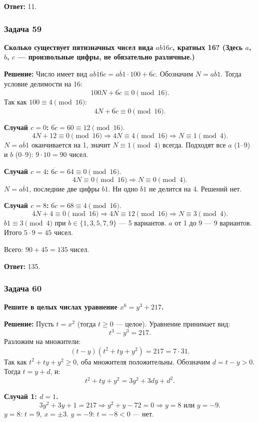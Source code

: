 \documentclass[12pt, a4paper]{article}
\begin{document}
\textbf{Ответ:} 11.

\subsubsection*{Задача 59}
\textbf{Сколько существует пятизначных чисел вида $\overline{ab16c}$, кратных 16? (Здесь $a$, $b$, $c$ — произвольные цифры, не обязательно различные.)}

\textbf{Решение:}
Число имеет вид $\overline{ab16c} = \overline{ab1} \cdot 100 + \overline{6c}$. Обозначим $N = \overline{ab1}$. Тогда условие делимости на 16:
\[
100N + \overline{6c} \equiv 0 \pmod{16}.
\]
Так как $100 \equiv 4 \pmod{16}$:
\[
4N + \overline{6c} \equiv 0 \pmod{16}.
\]

\textbf{Случай $c=0$:} $\overline{6c} = 60 \equiv 12 \pmod{16}$.
\[
4N + 12 \equiv 0 \pmod{16} \Rightarrow 4N \equiv 4 \pmod{16} \Rightarrow N \equiv 1 \pmod{4}.
\]
$N = \overline{ab1}$ оканчивается на 1, значит $N \equiv 1 \pmod{4}$ всегда. Подходят все $a$ (1–9) и $b$ (0–9): $9 \cdot 10 = 90$ чисел.

\textbf{Случай $c=4$:} $\overline{6c} = 64 \equiv 0 \pmod{16}$.
\[
4N \equiv 0 \pmod{16} \Rightarrow N \equiv 0 \pmod{4}.
\]
$N = \overline{ab1}$, последние две цифры $b1$. Ни одно $b1$ не делится на 4. Решений нет.

\textbf{Случай $c=8$:} $\overline{6c} = 68 \equiv 4 \pmod{16}$.
\[
4N + 4 \equiv 0 \pmod{16} \Rightarrow 4N \equiv 12 \pmod{16} \Rightarrow N \equiv 3 \pmod{4}.
\]
$b1 \equiv 3 \pmod{4}$ при $b \in \{1, 3, 5, 7, 9\}$ — 5 вариантов. $a$ от 1 до 9 — 9 вариантов. Итого $5 \cdot 9 = 45$ чисел.

Всего: $90 + 45 = 135$ чисел.

\textbf{Ответ:} 135.

\subsubsection*{Задача 60}
\textbf{Решите в целых числах уравнение $x^6 = y^3 + 217$.}

\textbf{Решение:}
Пусть $t = x^2$ (тогда $t \ge 0$ — целое). Уравнение принимает вид:
\[
t^3 - y^3 = 217.
\]
Разложим на множители:
\[
(t-y)(t^2 + ty + y^2) = 217 = 7 \cdot 31.
\]
Так как $t^2 + ty + y^2 \ge 0$, оба множителя положительны. Обозначим $d = t - y > 0$. Тогда $t = y + d$, и:
\[
t^2 + ty + y^2 = 3y^2 + 3dy + d^2.
\]

\textbf{Случай 1: $d = 1$.}
\[
3y^2 + 3y + 1 = 217 \Rightarrow y^2 + y - 72 = 0 \Rightarrow y = 8 \text{ или } y = -9.
\]
$y = 8$: $t = 9$, $x = \pm 3$. $y = -9$: $t = -8 < 0$ — нет.
\end{document}

